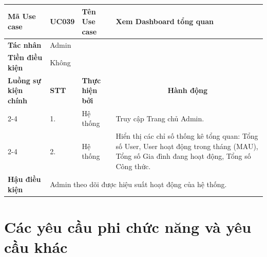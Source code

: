 \documentclass[../main.tex]{subfiles}
\begin{document}
\begin{longtable}{|p{2.7cm}|p{0.8cm}|p{2.6cm}|p{7.3cm}|}
\hline
\cellcolor[HTML]{D5F5E3}\textbf{Mã Use case} & \multicolumn{1}{l|}{UC039} & \cellcolor[HTML]{D5F5E3}\textbf{Tên Use case} & Xem Dashboard tổng quan \\ \hline
\cellcolor[HTML]{D5F5E3}\textbf{Tác nhân} & \multicolumn{3}{p{10.7cm}|}{Admin} \\ \hline
\cellcolor[HTML]{D5F5E3}\textbf{Tiền điều kiện} & \multicolumn{3}{p{10.7cm}|}{Không} \\ \hline

\cellcolor[HTML]{D5F5E3}\textbf{Luồng sự kiện chính} & \cellcolor[HTML]{FDEBD0}\textbf{STT} & \cellcolor[HTML]{FDEBD0}\textbf{Thực hiện bởi} & \multicolumn{1}{c|}{\cellcolor[HTML]{FDEBD0}\textbf{Hành động}} \\ \cline{2-4} 
\cellcolor[HTML]{D5F5E3} & 1. & Hệ thống & Truy cập Trang chủ Admin. \\ \cline{2-4} 
\cellcolor[HTML]{D5F5E3} & 2. & Hệ thống & Hiển thị các chỉ số thống kê tổng quan: Tổng số User, User hoạt động trong tháng (MAU), Tổng số Gia đình đang hoạt động, Tổng số Công thức. \\ \hline

\cellcolor[HTML]{D5F5E3}\textbf{Hậu điều kiện} & \multicolumn{3}{p{10.7cm}|}{Admin theo dõi được hiệu suất hoạt động của hệ thống.} \\ \hline
\end{longtable}
\endgroup



\section{Các yêu cầu phi chức năng và yêu cầu khác}
\end{document}
